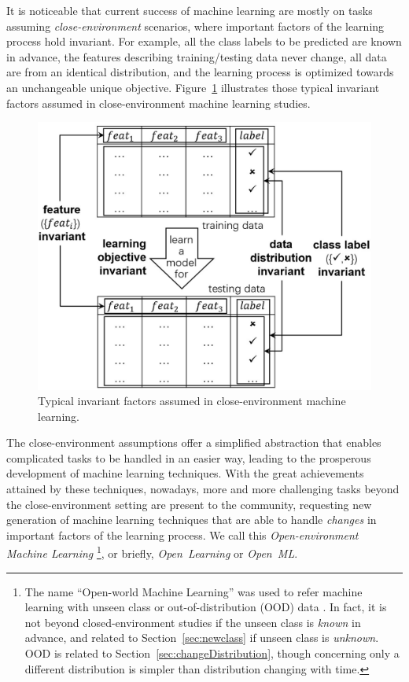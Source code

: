 \documentclass[review,11pt]{ReportTemplate}
\begin{document}
It is noticeable that current success of machine learning are mostly on tasks assuming \textit{close-environment} scenarios, where important factors of the learning process hold invariant. For example, all the class labels to be predicted are known in advance, the features describing training/testing data never change, all data are from an identical distribution, and the learning process is optimized towards an unchangeable unique objective. Figure~\ref{fig:fig1} illustrates those typical invariant factors assumed in close-environment machine learning studies.

\begin{figure}[!ht]
\begin{center}
  \includegraphics[width=.6\linewidth]{fig1}
  \caption{Typical invariant factors assumed in close-environment machine learning.}\label{fig:fig1}
\end{center}
\end{figure}

The close-environment assumptions offer a simplified abstraction that enables complicated tasks to be handled in an easier way, leading to the prosperous development of machine learning techniques. With the great achievements attained by these techniques, nowadays, more and more challenging tasks beyond the close-environment setting are present to the community, requesting new generation of machine learning techniques that are able to handle \textit{changes} in important factors of the learning process. We call this \textit{Open-environment Machine Learning} \footnote{The name ``Open-world Machine Learning'' was used to refer machine learning with unseen class \cite{Parmar:Chouhan:Raychoudhury2021} or out-of-distribution (OOD) data \cite{Sehwag:Bhagoji:Song2019}. In fact, it is not beyond closed-environment studies if the unseen class is \textit{known} in advance, and related to Section~\ref{sec:newclass} if unseen class is \textit{unknown}. OOD is related to Section~\ref{sec:changeDistribution}, though concerning only a different distribution is simpler than distribution changing with time.}, or briefly, \textit{Open~Learning} or \textit{Open~ML}.
\end{document}
